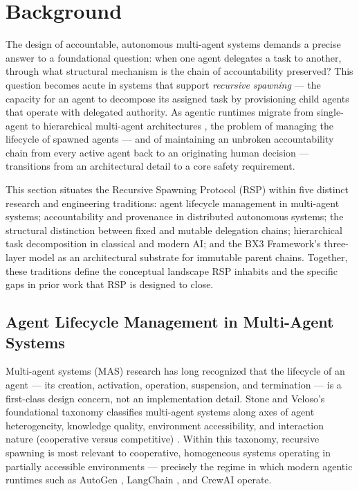 \section{Background}
\label{sec:background}

The design of accountable, autonomous multi-agent systems demands a precise answer to a foundational question: when one agent delegates a task to another, through what structural mechanism is the chain of accountability preserved? This question becomes acute in systems that support \emph{recursive spawning} — the capacity for an agent to decompose its assigned task by provisioning child agents that operate with delegated authority. As agentic runtimes migrate from single-agent to hierarchical multi-agent architectures \cite{wooldridge1995,stone2000}, the problem of managing the lifecycle of spawned agents — and of maintaining an unbroken accountability chain from every active agent back to an originating human decision — transitions from an architectural detail to a core safety requirement.

This section situates the Recursive Spawning Protocol (RSP) within five distinct research and engineering traditions: agent lifecycle management in multi-agent systems; accountability and provenance in distributed autonomous systems; the structural distinction between fixed and mutable delegation chains; hierarchical task decomposition in classical and modern AI; and the BX3 Framework's three-layer model as an architectural substrate for immutable parent chains. Together, these traditions define the conceptual landscape RSP inhabits and the specific gaps in prior work that RSP is designed to close.

\subsection{Agent Lifecycle Management in Multi-Agent Systems}

Multi-agent systems (MAS) research has long recognized that the lifecycle of an agent — its creation, activation, operation, suspension, and termination — is a first-class design concern, not an implementation detail. Stone and Veloso's foundational taxonomy classifies multi-agent systems along axes of agent heterogeneity, knowledge quality, environment accessibility, and interaction nature (cooperative versus competitive) \cite{stone2000}. Within this taxonomy, recursive spawning is most relevant to cooperative, homogeneous systems operating in partially accessible environments — precisely the regime in which modern agentic runtimes such as AutoGen \cite{autogen2023}, LangChain \cite{langchain2023}, and CrewAI \cite{crewai2024} operate.

